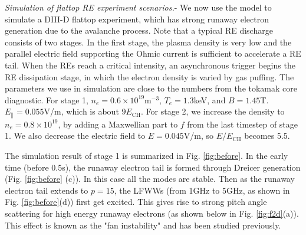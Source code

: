 \documentclass[aps, prl, preprint,english,superscriptaddress]{revtex4-1}
\begin{document}
\textit{Simulation of flattop RE experiment scenarios.}-
We now use the model to simulate a DIII-D flattop experiment, which has strong runaway electron generation due to the avalanche process. Note that a typical RE discharge consists of two stages. In the first stage, the plasma density is very low and the parallel electric field supporting the Ohmic current is sufficient to accelerate a RE tail. When the REs reach a critical intensity, an asynchronous trigger begins the RE dissipation stage, in which the electron density is varied by gas puffing. The parameters we use in simulation are close to the numbers from the tokamak core diagnostic. For stage 1, $n_{e}=0.6\times 10^{19}$m$^{-3}$, $T_{e}=1.3$keV,
and $B=1.45$T. $E_{\parallel}=0.055$V/m, which is about $9E_{\mathrm{CH}}$. For stage 2, we increase the density to $n_{e}=0.8\times 10^{19}$, by adding a Maxwellian part to $f$ from the last timestep of stage 1. We also decrease the electric field to $E=0.045$V/m, so $E/E_{\mathrm{CH}}$ becomes 5.5.

The simulation result of stage 1 is summarized in Fig. \ref{fig:before}. In the early time (before 0.5s), the runaway electron tail is formed through Dreicer generation (Fig. \ref{fig:before} (c)). In this case all the modes are stable. Then as the runaway electron tail extends to $p=15$, the LFWWs (from 1GHz to 5GHz, as shown in Fig. \ref{fig:before}(d)) first get excited. This gives rise to strong pitch angle scattering for high energy runaway electrons
(as shown below in Fig. \ref{fig:f2d}(a)). This effect is known as the "fan instability" and has been studied previously\cite{parail_kinetic_1978,pokol_quasi-linear_2008}.
\end{document}
